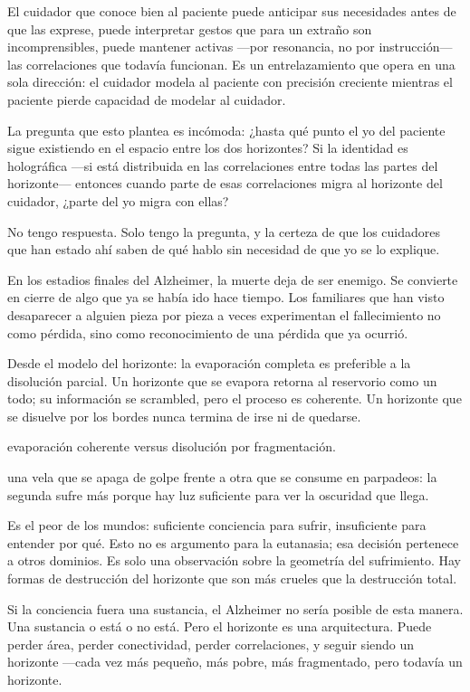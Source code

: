 El cuidador que conoce bien al paciente puede anticipar sus necesidades antes de que las exprese, puede interpretar gestos que para un extraño son incomprensibles, puede mantener activas —por resonancia, no por instrucción— las correlaciones que todavía funcionan. Es un entrelazamiento que opera en una sola dirección: el cuidador modela al paciente con precisión creciente mientras el paciente pierde capacidad de modelar al cuidador.

La pregunta que esto plantea es incómoda: ¿hasta qué punto el yo del paciente sigue existiendo en el espacio entre los dos horizontes? Si la identidad es holográfica —si está distribuida en las correlaciones entre todas las partes del horizonte— entonces cuando parte de esas correlaciones migra al horizonte del cuidador, ¿parte del yo migra con ellas?

No tengo respuesta. Solo tengo la pregunta, y la certeza de que los cuidadores que han estado ahí saben de qué hablo sin necesidad de que yo se lo explique.

\noindent En los estadios finales del Alzheimer, la muerte deja de ser enemigo. Se convierte en cierre de algo que ya se había ido hace tiempo. Los familiares que han visto desaparecer a alguien pieza por pieza a veces experimentan el fallecimiento no como pérdida, sino como reconocimiento de una pérdida que ya ocurrió.

Desde el modelo del horizonte: la evaporación completa es preferible a la disolución parcial. Un horizonte que se evapora retorna al reservorio como un todo; su información se scrambled, pero el proceso es coherente. Un horizonte que se disuelve por los bordes nunca termina de irse ni de quedarse.

\begin{fisica}
 evaporación coherente versus disolución por fragmentación.

 una vela que se apaga de golpe frente a otra que se consume en parpadeos: la segunda sufre más porque hay luz suficiente para ver la oscuridad que llega.
\end{fisica}
Es el peor de los mundos: suficiente conciencia para sufrir, insuficiente para entender por qué. Esto no es argumento para la eutanasia; esa decisión pertenece a otros dominios. Es solo una observación sobre la geometría del sufrimiento. Hay formas de destrucción del horizonte que son más crueles que la destrucción total.

\noindent Si la conciencia fuera una sustancia, el Alzheimer no sería posible de esta manera. Una sustancia o está o no está. Pero el horizonte es una arquitectura. Puede perder área, perder conectividad, perder correlaciones, y seguir siendo un horizonte —cada vez más pequeño, más pobre, más fragmentado, pero todavía un horizonte.


